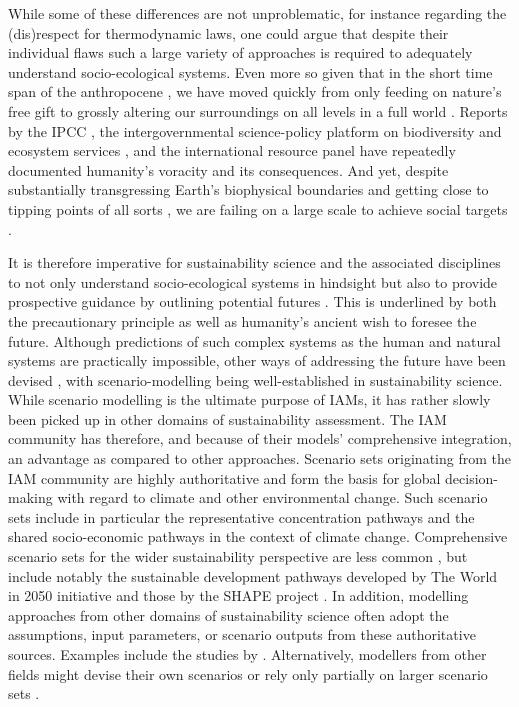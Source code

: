 \documentclass{article}
\begin{document}
\begin{refsection}
While some of these differences are not unproblematic, for instance regarding the (dis)respect for thermodynamic laws, one could argue that despite their individual flaws such a large variety of approaches is required to adequately understand socio-ecological systems. Even more so given that in the short time span of the anthropocene \parencite{crutzen_2006}, we have moved quickly from only feeding on nature's free gift \parencite{karsten_1987} to grossly altering our surroundings on all levels in a full world \parencite{daly_2005}. Reports by the IPCC \parencite[e.g.][]{ipcc_2022}, the intergovernmental science-policy platform on biodiversity and ecosystem services \parencite*[e.g. IPBES,][]{ipbes_2019}, and the international resource panel \parencite[e.g.][]{unep_2016} have repeatedly documented humanity's voracity and its consequences. And yet, despite substantially transgressing Earth's biophysical boundaries and getting close to tipping points of all sorts \parencite{ceballos_2015,steffen_2015, steffen_2018}, we are failing on a large scale to achieve social targets \parencite{fanning_2022}.

It is therefore imperative for sustainability science and the associated disciplines to not only understand socio-ecological systems in hindsight \parencite{kates_2001} but also to provide prospective guidance by outlining potential futures \parencite{swart_2004}. This is underlined by both the precautionary principle\footnotemark{} as well as humanity's ancient wish to foresee the future. Although predictions of such complex systems as the human and natural systems are practically impossible, other ways of addressing the future have been devised \parencite{polasky_2011}, with scenario-modelling being well-established in sustainability science. While scenario modelling is the ultimate purpose of IAMs, it has rather slowly been picked up in other domains of sustainability assessment. The IAM community has therefore, and because of their models' comprehensive integration, an advantage as compared to other approaches. Scenario sets originating from the IAM community are highly authoritative and form the basis for global decision-making with regard to climate and other environmental change. Such scenario sets include in particular the representative concentration pathways \parencite[RCPs;][]{vanvuuren_2011_rcp} and the shared socio-economic pathways \parencite[SSPs;][]{riahi_2017,oneill_2014} in the context of climate change. Comprehensive scenario sets for the wider sustainability perspective are less common \parencite{vansoest_2019}, but include notably the sustainable development pathways developed by The World in 2050 initiative \parencite{twi_2018} and those by the SHAPE project \parencite[e.g.][]{soergel_2021}. In addition, modelling approaches from other domains of sustainability science often adopt the assumptions, input parameters, or scenario outputs from these authoritative sources. Examples include the studies by \textcite{deetman_2018,beltran_2020,schandl_2020}. Alternatively, modellers from other fields might devise their own scenarios or rely only partially on larger scenario sets \parencite[for example][]{pauliuk_2013}.


\end{refsection}
\end{document}
